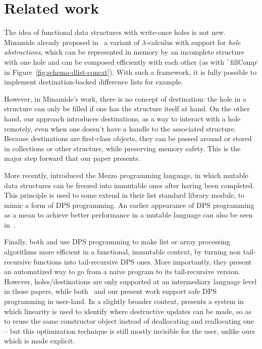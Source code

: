 \documentclass[english]{jflart}
\begin{document}
\section{Related work}

The idea of functional data structures with write-once holes is not new. Minamide already proposed in~\cite{minamide_functional_1998} a variant of $\lambda$-calculus with support for \emph{hole abstractions}, which can be represented in memory by an incomplete structure with one hole and can be composed efficiently with each other (as with \texttt`fillComp` in Figure~\ref{fig:schema-dlist-concat}). With such a framework, it is fully possible to implement destination-backed difference lists for example.

However, in Minamide's work, there is no concept of destination: the hole in a structure can only be filled if one has the structure itself at hand. On the other hand, our approach introduces destinations, as a way to interact with a hole remotely, even when one doesn't have a handle to the associated structure. Because destinations are first-class objects, they can be passed around or stored in collections or other structure, while preserving memory safety. This is the major step forward that our paper presents.

More recently, \cite{protzenko_mezzo_2013} introduced the Mezzo programming language, in which mutable data structures can be freezed into immutable ones after having been completed. This principle is used to some extend in their list standard library module, to mimic a form of DPS programming. An earlier appearance of DPS programming as a mean to achieve better performance in a mutable language can also be seen in~\cite{larus_restructuring_1989}.

Finally, both \cite{shaikhha_destination-passing_2017} and \cite{bour_tmc_2021} use DPS programming to make list or array processing algorithms more efficient in a functional, immutable context, by turning non tail-recursive functions into tail-recursive DPS ones. More importantly, they present an automatized way to go from a naive program to its tail-recursive version. However, holes/destinations are only supported at an intermediary language level in those papers, while both~\cite{minamide_functional_1998} and our present work support safe DPS programming in user-land. In a slightly broader context, \cite{lorenzen_fp_2023} presents a system in which linearity is used to identify where destructive updates can be made, so as to reuse the same constructor object instead of deallocating and reallocating one -- but this optimization technique is still mostly invisible for the user, unlike ours which is made explicit.
\end{document}
